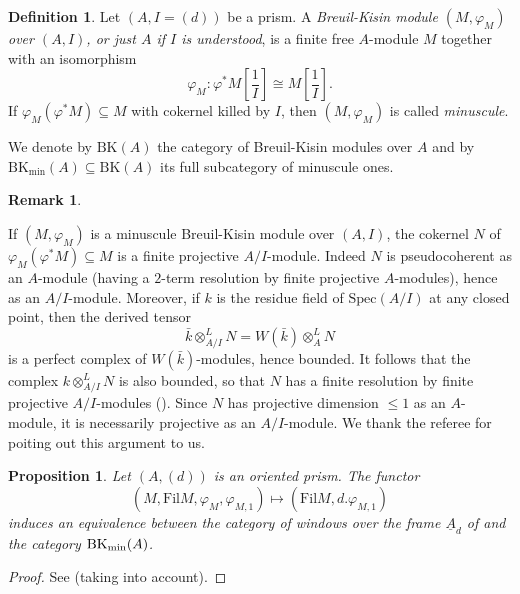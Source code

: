 \documentclass{amsart}
\theoremstyle{plain}
\newtheorem{proposition}[theorem]{Proposition}
\theoremstyle{definition}
\newtheorem{definition}[theorem]{Definition}
\newtheorem{remark}[theorem]{Remark}
\begin{document}
\begin{definition}
  \label{sec:comp-case-mathc-definition-breuil-kisin-module}
  Let $(A,I=(d))$ be a prism. A \textit{Breuil-Kisin module $(M,\varphi_M)$ over $(A,I)$, or just $A$ if $I$ is understood}, is a finite free $A$-module $M$ together with an isomorphism
  $$
  \varphi_M\colon \varphi^{\ast}M[\frac{1}{I}]\cong M[\frac{1}{I}].
  $$
  If $\varphi_M(\varphi^{\ast}M)\subseteq M$ with cokernel killed by $I$, then $(M,\varphi_M)$ is called \textit{minuscule}.
  
  We denote by $\mathrm{BK}(A)$ the category of Breuil-Kisin modules over $A$ and by $\mathrm{BK}_{\mathrm{min}}(A)\subseteq \mathrm{BK}(A)$ its full subcategory of minuscule ones.
\end{definition}


\begin{remark}
  \label{remark-projectivity-referee}
  
If $(M,\varphi_M)$ is a minuscule Breuil-Kisin module over $(A,I)$, the cokernel $N$ of $\varphi_M(\varphi^{\ast}M)\subseteq M$ is a finite projective $A/I$-module. Indeed $N$ is pseudocoherent as an $A$-module (having a $2$-term resolution by finite projective $A$-modules), hence as an $A/I$-module. Moreover, if $k$ is the residue field of $\mathrm{Spec}(A/I)$ at any closed point, then the derived tensor
$$ \bar{k} \otimes_{A/I}^L N = W(\bar{k}) \otimes_A^L N $$
is a perfect complex of $W(\bar{k})$-modules, hence bounded. It follows that the complex $k \otimes_{A/I}^L N$ is also bounded, so that $N$ has a finite resolution by finite projective $A/I$-modules (\cite[Tag 068W]{stacks_project}). Since $N$ has projective dimension $\leq 1$ as an $A$-module, it is necessarily projective as an $A/I$-module. We thank the referee for poiting out this argument to us.
\end{remark}



\begin{proposition}
  \label{sec:abstr-divid-prism-remark-cais-lau-principal}
  Let $(A,(d))$ is an oriented prism. The functor 
$$
(M,\mathrm{Fil} M,\varphi_M, \varphi_{M,1}) \mapsto (\mathrm{Fil} M, d.\varphi_{M,1})
$$
induces an equivalence between the category of windows over the frame $\underline{A}_d$ of  and the category $\mathrm{BK}_{\rm min}(A)$.  \end{proposition}
  \begin{proof}
  See \cite[Lemma 2.1.16]{cais_lau_dieudonne_crystals_and_wach_modules_for_p_divisible_groups} (taking  into account). 
    \end{proof}	
\end{document}
